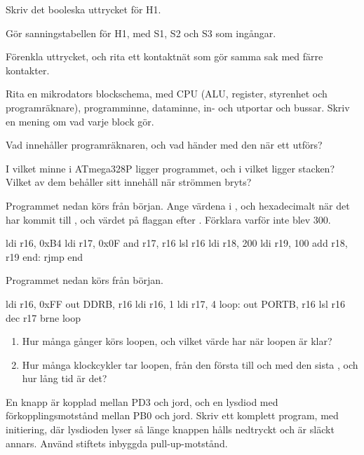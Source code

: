  Skriv det booleska uttrycket för H1. 

 Gör sanningstabellen för H1, med S1, S2 och S3 som ingångar. 

 Förenkla uttrycket, och rita ett kontaktnät som gör samma sak med färre kontakter.

\label{practice:q:5}

 Rita en mikrodators blockschema, med CPU (ALU, register, styrenhet och programräknare),
programminne, dataminne, in- och utportar och bussar. Skriv en mening om vad varje block gör.

 Vad innehåller programräknaren, och vad händer med den när ett  utförs?

 I vilket minne i ATmega328P ligger programmet, och i vilket ligger stacken? Vilket av dem
behåller sitt innehåll när strömmen bryts? 

\label{practice:q:6}

 Programmet nedan körs från början. Ange värdena i ,  och 
hexadecimalt när det har kommit till , och värdet på flaggan  efter .
Förklara varför  inte blev 300. 

\begin{asmcode}
    ldi r16, 0xB4
    ldi r17, 0x0F
    and r17, r16
    lsl r16
    ldi r18, 200
    ldi r19, 100
    add r18, r19
end:
    rjmp end
\end{asmcode}

 Programmet nedan körs från början.

\begin{asmcode}
    ldi r16, 0xFF
    out DDRB, r16
    ldi r16, 1
    ldi r17, 4
loop:
    out PORTB, r16
    lsl r16
    dec r17
    brne loop
\end{asmcode}

\begin{enumerate}
  \item Hur många gånger körs loopen, och vilket värde har  när loopen är klar?
  \item Hur många klockcykler tar loopen, från den första  till och med den sista
    , och hur lång tid är det? 
\end{enumerate}

 En knapp är kopplad mellan PD3 och jord, och en lysdiod med förkopplingsmotstånd mellan
PB0 och jord. Skriv ett komplett program, med initiering, där lysdioden lyser så länge knappen
hålls nedtryckt och är släckt annars. Använd stiftets inbyggda pull-up-motstånd. 
